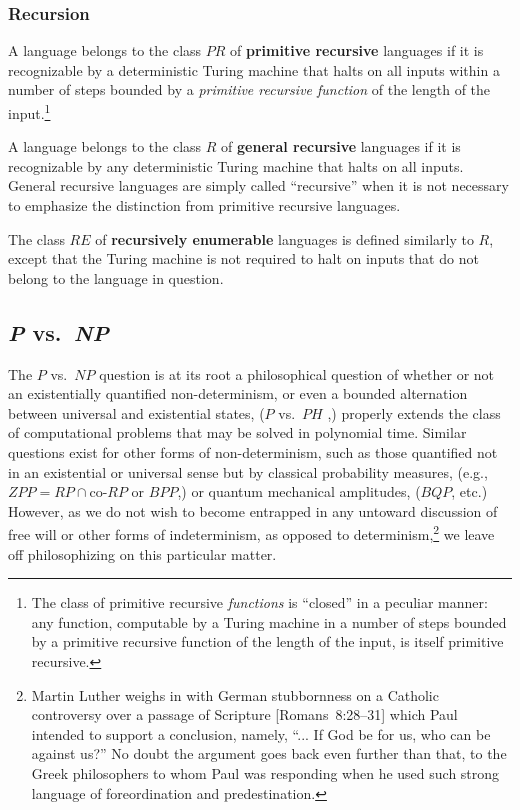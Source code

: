 \documentclass[letterpaper]{article}
\begin{document}
\subsubsection{Recursion}
\begin{definition}
A language belongs to the class $PR$ of \textbf{primitive recursive} languages if it is recognizable by a deterministic Turing machine that halts on all inputs within a number of steps bounded by a \textit{primitive recursive function} \cite{robinson1949definability} of the length of the input.\footnote{The class of primitive recursive \textit{functions} is ``closed'' in a peculiar manner: any function, computable by a Turing machine in a number of steps bounded by a primitive recursive function of the length of the input, is itself primitive recursive.}
\end{definition}
\begin{definition}
A language belongs to the class $R$ of \textbf{general recursive} languages if it is recognizable by any deterministic Turing machine that halts on all inputs.  General recursive languages are simply called ``recursive'' when it is not necessary to emphasize the distinction from primitive recursive languages.
\end{definition}
\begin{definition}\label{def-re}
The class $RE$ of \textbf{recursively enumerable} languages is defined similarly to $R$, except that the Turing machine is not required to halt on inputs that do not belong to the language in question.
\end{definition}

\subsection{\textit{P} vs.\ \textit{NP}}

The $P$ vs.\ $NP$ question is at its root a philosophical question of whether or not an existentially quantified non-determinism, or even a bounded alternation between universal and existential states, ($P$ vs.\ $PH$ \cite{meurant2014algorithms},) properly extends the class of computational problems that may be solved in polynomial time.  Similar questions exist for other forms of non-determinism, such as those quantified not in an existential or universal sense but by classical probability measures, (e.g.,\ $ZPP=RP\operatorname\cap\textrm{co-}RP$ or $BPP$,) or quantum mechanical amplitudes, ($BQP$, etc.)  However, as we do not wish to become entrapped in any untoward discussion of free will or other forms of indeterminism, as opposed to determinism,\footnote{Martin Luther \cite{lutherliber} weighs in with German stubbornness on a Catholic controversy over a passage of Scripture [Romans~8:28--31] which Paul intended to support a conclusion, namely, ``... If God be for us, who can be against us?''   No doubt the argument goes back even further than that, to the Greek philosophers to whom Paul was responding when he used such strong language of foreordination and predestination.} we leave off philosophizing on this particular matter.
\end{document}
